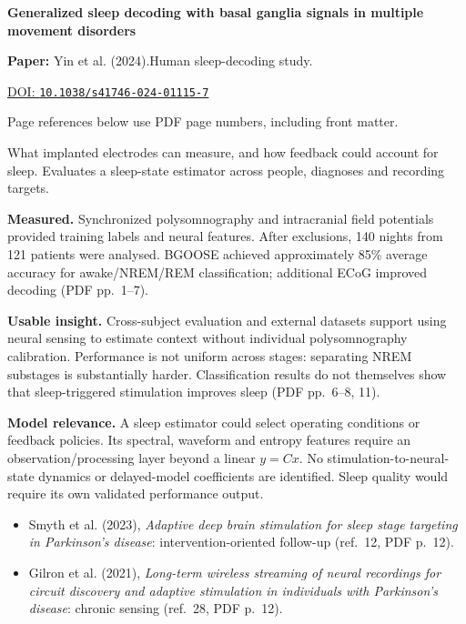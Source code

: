 

{\Large\bfseries Generalized sleep decoding with basal ganglia signals in multiple movement disorders\par}

\textbf{Paper:} Yin et al. (2024).\quad Human sleep-decoding study.\par
\href{https://doi.org/10.1038/s41746-024-01115-7}{DOI: \nolinkurl{10.1038/s41746-024-01115-7}}\par
{\footnotesize Page references below use PDF page numbers, including front matter.}

What implanted electrodes can measure, and how feedback could account for sleep. Evaluates a sleep-state estimator across people, diagnoses and recording targets.

\textbf{Measured.} Synchronized polysomnography and intracranial field potentials provided training labels and neural features. After exclusions, 140 nights from 121 patients were analysed. BGOOSE achieved approximately 85\% average accuracy for awake/NREM/REM classification; additional ECoG improved decoding (PDF pp.~1--7).

\textbf{Usable insight.} Cross-subject evaluation and external datasets support using neural sensing to estimate context without individual polysomnography calibration. Performance is not uniform across stages: separating NREM substages is substantially harder. Classification results do not themselves show that sleep-triggered stimulation improves sleep (PDF pp.~6--8, 11).

\textbf{Model relevance.} A sleep estimator could select operating conditions or feedback policies. Its spectral, waveform and entropy features require an observation/processing layer beyond a linear $y=Cx$. No stimulation-to-neural-state dynamics or delayed-model coefficients are identified. Sleep quality would require its own validated performance output.

\begin{itemize}
\item Smyth et al. (2023), \emph{Adaptive deep brain stimulation for sleep stage targeting in Parkinson's disease}: intervention-oriented follow-up (ref.~12, PDF p.~12).
\item Gilron et al. (2021), \emph{Long-term wireless streaming of neural recordings for circuit discovery and adaptive stimulation in individuals with Parkinson's disease}: chronic sensing (ref.~28, PDF p.~12).
\end{itemize}


